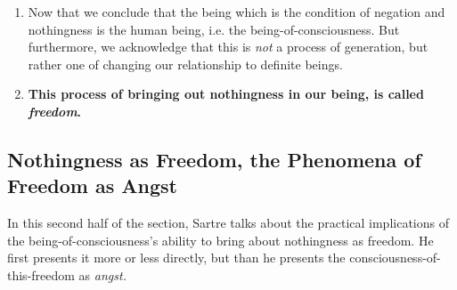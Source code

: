 \begin{enumerate}
\begin{enumerate}
  \end{enumerate}
  \item Now that we conclude that the being which is the condition of negation and nothingness is the human being, i.e. the being-of-consciousness. But furthermore, we acknowledge that this is \emph{not} a process of generation, but rather one of changing our relationship to definite beings.
  \item \textbf{This process of bringing out nothingness in our being, is called \emph{freedom}.}
\end{enumerate}

\subsection*{Nothingness as Freedom, the Phenomena of Freedom as Angst}
In this second half of the section, Sartre talks about the practical implications of the being-of-consciousness's ability to bring about nothingness as freedom. He first presents it more or less directly, but than he presents the consciousness-of-this-freedom as \emph{angst.}

